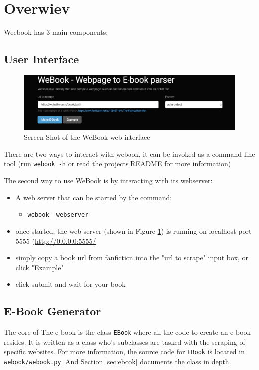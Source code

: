 \documentclass[]{report}   %
\begin{document}
\section{Overwiev}
Weebook has 3 main components:
\subsection{User Interface}
\begin{figure}[h]
    \includegraphics[width=\textwidth]{img/webook_web.png}
    \caption{Screen Shot of the WeBook web interface}
    \label{fig:webook-web}
\end{figure}

There are two ways to interact with webook, it can be invoked as a command line tool (run \texttt{webook -h} or read the projects README for more information)

The second way to use WeBook is by interacting with its webserver:
\begin{itemize}
    \item A web server that can be started by the command:
    \begin{itemize}
        \item \texttt{webook --webserver}
    \end{itemize}
    \item once started, the web server (shown in Figure \ref{fig:webook-web})
        is running on localhost port 5555 (\url{http://0.0.0.0:5555/}
    \item simply copy a book url from fanfiction into the "url to scrape" input box, or click "Example"
    \item click submit and wait for your book
\end{itemize}

\subsection{E-Book Generator}
The core of The e-book is the class \texttt{EBook} where all the code to create
an e-book resides. It is written as a class who's subclasses are tasked with
the scraping of specific websites. For more information, the source code for
\texttt{EBook} is located in \texttt{webook/webook.py}. And Section
\ref{sec:ebook} documents the class in depth.
\end{document}
